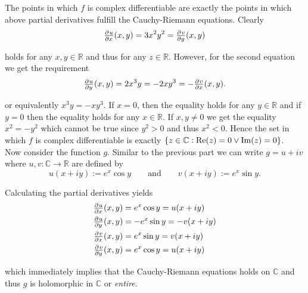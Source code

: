 \begin{enumerate}[label = \textbf{Exercise \arabic*.},wide = 0pt, itemsep=1.5ex]
	The points in which $f$ is complex differentiable are exactly the points in which above partial derivatives fulfill the Cauchy-Riemann equations. Clearly 
	\begin{equation}
		\pd{u}{x}(x,y) = 3x^2 y^2 = \pd{v}{y}(x,y)
	\end{equation}

	\noindent holds for any $x,y \in \mathbb{R}$ and thus for any $z \in \mathbb{R}$. However, for the second equation we get the requirement
	\begin{equation}
		\pd{u}{y}(x,y) = 2x^3y = -2xy^3 = -\pd{v}{x}(x,y). 
	\end{equation}

	\noindent or equivalently $x^3y = -xy^3$. If $x = 0$, then the equality holds for any $y \in \mathbb{R}$ and if $y = 0$ then the equality holds for any $x \in \mathbb{R}$. If $x,y \neq 0$ we get the equality $x^2 = -y^2$ which cannot be true since $y^2 > 0$ and thus $x^2 < 0$. Hence the set in which $f$ is complex differentiable is exactly $\cbr[0]{z \in \mathbb{C} : \Re(z) = 0 \vee \Im(z) = 0}$.\\
	Now consider the function $g$. Similar to the previous part we can write $g = u + iv$ where $u,v: \mathbb{C} \to \mathbb{R}$ are defined by 
	\begin{equation}
		u(x + iy) := e^x\cos y \qquad \text{and} \qquad v(x + iy) := e^x \sin y.	
	\end{equation}

	Calculating the partial derivatives yields
	\begin{align*}
		\pd{u}{x}(x,y) &= e^x\cos y = u(x + iy)\\
		\pd{u}{y}(x,y) &= -e^x\sin y = -v(x + iy)\\
		\pd{v}{x}(x,y) &= e^x\sin y = v(x + iy)\\
		\pd{v}{y}(x,y) &= e^x\cos y = u(x + iy)
	\end{align*}

	\noindent which immediately implies that the Cauchy-Riemann equations holds on $\mathbb{C}$ and thus $g$ is holomorphic in $\mathbb{C}$ or \emph{entire}.

\end{enumerate}
\printbibliography

